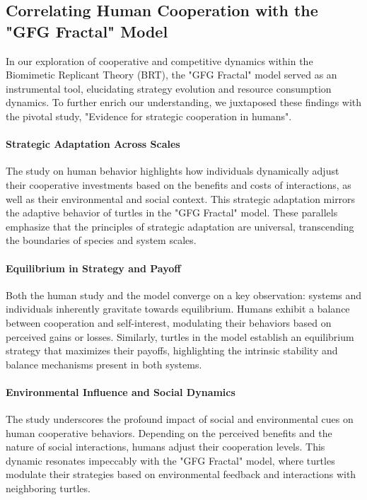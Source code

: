 \documentclass[sn-nature]{sn-jnl}%
\theoremstyle{thmstyleone}%
\theoremstyle{thmstyletwo}%
\theoremstyle{thmstylethree}%
\begin{document}
\subsection{Correlating Human Cooperation with the "GFG Fractal" Model}
In our exploration of cooperative and competitive dynamics within the Biomimetic Replicant Theory (BRT), the "GFG Fractal" model served as an instrumental tool, elucidating strategy evolution and resource consumption dynamics. To further enrich our understanding, we juxtaposed these findings with the pivotal study, "Evidence for strategic cooperation in humans".

\paragraph{Strategic Adaptation Across Scales}
The study on human behavior highlights how individuals dynamically adjust their cooperative investments based on the benefits and costs of interactions, as well as their environmental and social context. This strategic adaptation mirrors the adaptive behavior of turtles in the "GFG Fractal" model. These parallels emphasize that the principles of strategic adaptation are universal, transcending the boundaries of species and system scales.

\paragraph{Equilibrium in Strategy and Payoff}
Both the human study and the model converge on a key observation: systems and individuals inherently gravitate towards equilibrium. Humans exhibit a balance between cooperation and self-interest, modulating their behaviors based on perceived gains or losses. Similarly, turtles in the model establish an equilibrium strategy that maximizes their payoffs, highlighting the intrinsic stability and balance mechanisms present in both systems.
\paragraph{
Environmental Influence and Social Dynamics}
The study underscores the profound impact of social and environmental cues on human cooperative behaviors. Depending on the perceived benefits and the nature of social interactions, humans adjust their cooperation levels. This dynamic resonates impeccably with the "GFG Fractal" model, where turtles modulate their strategies based on environmental feedback and interactions with neighboring turtles.
\end{document}
